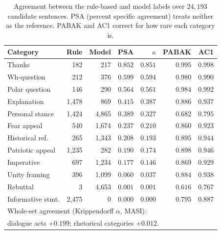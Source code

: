 \documentclass[pdflatex,sn-mathphys-num]{sn-jnl}%
\begin{document}
\begin{appendices}
\begin{table}[h]
\caption{Agreement between the rule-based and model labels over $24{,}193$
candidate sentences. PSA (percent specific agreement) treats neither as
the reference. PABAK and AC1 correct for how rare each category is.}
\label{tab:kappa}
\centering
\footnotesize
\setlength{\tabcolsep}{3pt}
\begin{tabular}{lrrrrrr}
\toprule
Category & Rule & Model & PSA & $\kappa$ & PABAK & AC1 \\
\midrule
Thanks            & 182   & 217   & $0.852$ & $0.851$ & $0.995$ & $0.998$ \\
Wh-question       & 212   & 376   & $0.599$ & $0.594$ & $0.980$ & $0.990$ \\
Polar question    & 146   & 290   & $0.564$ & $0.561$ & $0.984$ & $0.992$ \\
Explanation       & 1{,}478 & 869 & $0.415$ & $0.387$ & $0.886$ & $0.937$ \\
Personal stance   & 1{,}424 & 4{,}865 & $0.389$ & $0.327$ & $0.682$ & $0.795$ \\
Fear appeal       & 540   & 1{,}674 & $0.237$ & $0.210$ & $0.860$ & $0.923$ \\
Historical ref.   & 265   & 1{,}343 & $0.208$ & $0.193$ & $0.895$ & $0.944$ \\
Patriotic appeal  & 1{,}235 & 282  & $0.190$ & $0.174$ & $0.898$ & $0.946$ \\
Imperative        & 697   & 1{,}234 & $0.177$ & $0.146$ & $0.869$ & $0.929$ \\
Unity framing     & 396   & 1{,}099 & $0.060$ & $0.037$ & $0.884$ & $0.938$ \\
Rebuttal          & 3     & 4{,}653 & $0.001$ & $0.001$ & $0.616$ & $0.767$ \\
Informative stmt. & 2{,}475 & 0    & $0.000$ & $0.000$ & $0.795$ & $0.887$ \\
\midrule
\multicolumn{7}{l}{Whole-set agreement (Krippendorff $\alpha$, MASI):} \\
\multicolumn{7}{l}{dialogue acts $+0.199$; rhetorical categories $+0.012$.} \\
\bottomrule
\end{tabular}
\end{table}


\end{appendices}
\end{document}
